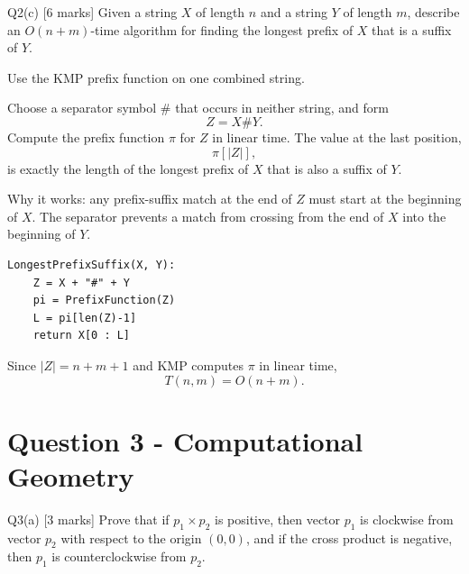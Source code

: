 \documentclass[10.5pt,a4paper]{article}
\begin{document}
\begin{questionbox}{Q2(c) [6 marks]}
Given a string $X$ of length $n$ and a string $Y$ of length $m$, describe an $O(n+m)$-time algorithm for finding the longest prefix of $X$ that is a suffix of $Y$.
\end{questionbox}

\begin{answerbox}
Use the KMP prefix function on one combined string.

Choose a separator symbol $\#$ that occurs in neither string, and form
\[
Z=X\#Y.
\]
Compute the prefix function $\pi$ for $Z$ in linear time. The value at the last position,
\[
\boxed{\pi[|Z|]},
\]
is exactly the length of the longest prefix of $X$ that is also a suffix of $Y$.

Why it works: any prefix-suffix match at the end of $Z$ must start at the beginning of $X$. The separator prevents a match from crossing from the end of $X$ into the beginning of $Y$.

\begin{lstlisting}
LongestPrefixSuffix(X, Y):
    Z = X + "#" + Y
    pi = PrefixFunction(Z)
    L = pi[len(Z)-1]
    return X[0 : L]
\end{lstlisting}

Since $|Z|=n+m+1$ and KMP computes $\pi$ in linear time,
\[
\boxed{T(n,m)=O(n+m).}
\]
\end{answerbox}

\section{Question 3 - Computational Geometry}

\begin{questionbox}{Q3(a) [3 marks]}
Prove that if $p_1\times p_2$ is positive, then vector $p_1$ is clockwise from vector $p_2$ with respect to the origin $(0,0)$, and if the cross product is negative, then $p_1$ is counterclockwise from $p_2$.
\end{questionbox}
\end{document}

